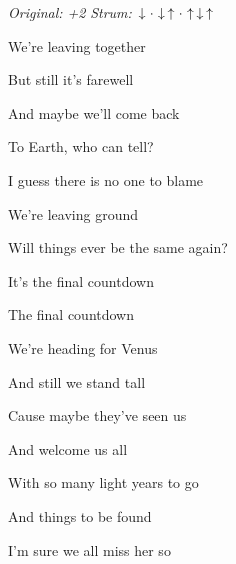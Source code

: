 \begin{song}


\begin{headerbox}
\textit{Original: +2} \quad
\textit{Strum:} $\Down\Miss\Down\Up\Miss\Up\Down\Up$
\end{headerbox}

\begin{hchordbox}
\end{hchordbox}

\Large

\bigskip

\Intro \par
{}    \par
{}    \par
{}     \par

\bigskip

 We’re leaving together \par
{} But still it’s farewell \par
{} And maybe we’ll come back \par
{} To Earth, who can tell? \par
{} I guess there is no one to blame \par
{} We’re leaving ground  \par
{} Will things ever be the same again? \par

\bigskip

It’s the final countdown    \par
The final countdown    \par

\bigskip

 We’re heading for Venus  \par
{} And still we stand tall \par
{} Cause maybe they’ve seen us \par
{} And welcome us all  \par
{} With so many light years to go \par
{} And things to be found  \par
{} I’m sure we all miss her so \par


\end{song}

